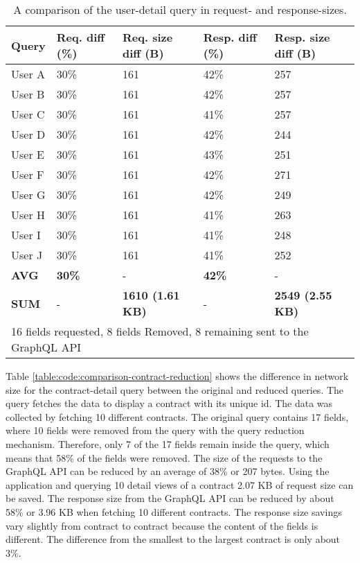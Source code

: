 \ifshowTables
\begin{table}[!htbp]
  \begin{tabular}{|l|l|l|l|l|}
  \hline
  \textbf{Query} & \textbf{Req. diff (\%)} & \textbf{Req. size diff (B)} & \textbf{Resp. diff (\%)} & \textbf{Resp. size diff (B)} \\
  \hline
  User A & 30\% & 161 & 42\% & 257 \\
  \hline
  User B & 30\% & 161 & 42\% & 257 \\
  \hline
  User C & 30\% & 161 & 41\% & 257 \\
  \hline
  User D & 30\% & 161 & 42\% & 244 \\
  \hline
  User E & 30\% & 161 & 43\% & 251 \\
  \hline
  User F & 30\% & 161 & 42\% & 271 \\
  \hline
  User G & 30\% & 161 & 42\% & 249 \\
  \hline
  User H & 30\% & 161 & 41\% & 263 \\
  \hline
  User I & 30\% & 161 & 41\% & 248 \\
  \hline
  User J & 30\% & 161 & 41\% & 252 \\
  \hline
  \hline
  \textbf{AVG} & \textbf{30\%} & - & \textbf{42\%} & -  \\
  \hline
  \hline
  \textbf{SUM} & - & \textbf{1610 (1.61 KB)} & - & \textbf{2549 (2.55 KB)} \\
  \hline
  \multicolumn{5}{l}{16 fields requested, 8 fields Removed, 8 remaining sent to the GraphQL \ac{API}}
  \end{tabular}
  \caption{A comparison of the user-detail query in request- and response-sizes.}\label{table:code:comparison-user-reduction}
\end{table}
\fi


\noindent Table \ref{table:code:comparison-contract-reduction} shows the difference in network size for the contract-detail query between the original and reduced queries. The query fetches the data to display a contract with its unique id. The data was collected by fetching 10 different contracts. The original query contains 17 fields, where 10 fields were removed from the query with the query reduction mechanism. Therefore, only 7 of the 17 fields remain inside the query, which means that 58\% of the fields were removed. The size of the requests to the GraphQL \ac{API} can be reduced by an average of 38\% or 207 bytes. Using the application and querying 10 detail views of a contract 2.07 KB of request size can be saved. The response size from the GraphQL \ac{API} can be reduced by about 58\% or 3.96 KB when fetching 10 different contracts. The response size savings vary slightly from contract to contract because the content of the fields is different. The difference from the smallest to the largest contract is only about 3\%.

